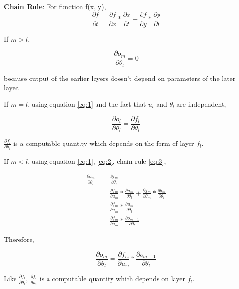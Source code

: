 \documentclass[a4paper]{tufte-handout}
\begin{document}
\begin{framed}
\textbf{Chain Rule}: For function f(x, y), 
\begin{equation}
\frac{\partial f}{\partial t} = \frac{\partial f}{\partial x} * \frac{\partial x}{\partial t} + \frac{\partial f}{\partial y} * \frac{\partial y}{\partial t}
\label{eq:3}
\end{equation}

\end{framed}

If \(m > l\),

\begin{equation}
\frac{\partial o_m}{\partial \theta_l} = 0 \label{eq:4}
\end{equation}


because output of the earlier layers doesn't depend on parameters of the later
layer.

If \(m = l\), using equation \eqref{eq:1} and the fact that \(u_l\) and
\(\theta_l\) are independent,

\begin{equation}
\frac{\partial o_l}{\partial \theta_l} = \frac{\partial f_l}{\partial \theta_l}
\label{eq:5}
\end{equation}

\(\frac{\partial f_l}{\partial \theta_l}\) is a computable quantity
which depends on the form of layer \(f_l\).

If \(m < l\), using equation \eqref{eq:1}, \eqref{eq:2}, chain rule \eqref{eq:3},

\begin{align*}
\frac{\partial o_m}{\partial \theta_l} &= \frac{\partial f_m}{\partial \theta_l}\\
&= \frac{\partial f_m}{\partial u_m} * \frac{\partial u_m}{\partial \theta_l} + \frac{\partial f_m}{\partial \theta_m} * \frac{\partial \theta_m}{\partial \theta_l}\\
&= \frac{\partial f_m}{\partial u_m} * \frac{\partial u_m}{\partial \theta_l}\\
&= \frac{\partial f_m}{\partial u_m} * \frac{\partial o_{m-1}}{\partial \theta_l}
\end{align*}


Therefore,

\begin{equation}
\frac{\partial o_m}{\partial \theta_l} = \frac{\partial f_m}{\partial u_m} * \frac{\partial o_{m-1}}{\partial \theta_l}
\label{eq:6}
\end{equation}

Like \(\frac{\partial f_l}{\partial \theta_l}\),
\(\frac{\partial f_l}{\partial u_l}\) is a computable quantity which
depends on layer \(f_l\).
\end{document}
